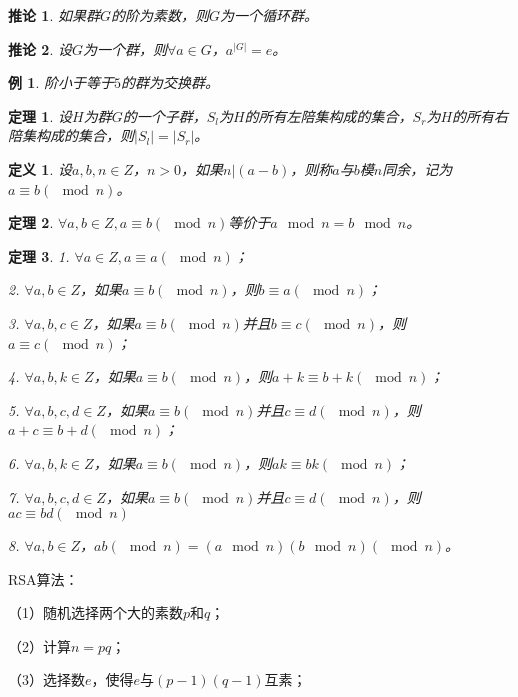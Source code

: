 \documentclass{article}
\newtheorem{Def}{定义}
\newtheorem{Thm}{定理}
\newtheorem*{Example}{例}
\newtheorem{Cor}{推论}
\begin{document}
\begin{CJK*}{UTF8}{gbsn}
\begin{Cor}
  如果群$G$的阶为素数，则$G$为一个循环群。
\end{Cor}

\begin{Cor}
  设$G$为一个群，则$\forall a\in G$，$a^{|G|}=e$。
\end{Cor}

\begin{Example}
  阶小于等于$5$的群为交换群。
\end{Example}

\begin{Thm}
  设$H$为群$G$的一个子群，$S_l$为$H$的所有左陪集构成的集合，$S_r$为$H$的所有右陪集构成的集合，则$|S_l|=|S_r|$。
\end{Thm}

\begin{Def}
  设$a,b,n\in Z$，$n>0$，如果$n|(a-b)$，则称$a$与$b$模$n$同余，记为$a \equiv b(\mod n)$。
\end{Def}

\begin{Thm}
  $\forall a,b\in Z, a\equiv b(\mod n)$等价于$a\mod n = b \mod n$。
\end{Thm}

\begin{Thm}
  1. $\forall a\in Z, a \equiv a (\mod n)$；

  2. $\forall a, b\in Z$，如果$a\equiv b (\mod n)$，则$b\equiv a(\mod n)$；

  3. $\forall a,b,c\in Z$，如果$a\equiv b(\mod n)$并且$b\equiv c(\mod n)$，则$a\equiv c(\mod n)$；

  4. $\forall a,b,k\in Z$，如果$a\equiv b(\mod n)$，则$a+k\equiv b+k(\mod n)$；

  5. $\forall a,b,c,d\in Z$，如果$a\equiv b(\mod n)$并且$c\equiv d(\mod n)$，则$a+c\equiv b+d (\mod n)$；

  6. $\forall a,b,k\in Z$，如果$a\equiv b(\mod n)$，则$ak\equiv bk(\mod n)$；

  7. $\forall a,b,c,d\in Z$，如果$a\equiv b(\mod n)$并且$c\equiv d(\mod n)$，则$ac\equiv bd (\mod n)$

  8. $\forall a,b\in Z$，$ab (\mod n)=(a\mod n)(b\mod n) (\mod n)$。
\end{Thm}

RSA算法：

（1）随机选择两个大的素数$p$和$q$；

（2）计算$n=pq$；

（3）选择数$e$，使得$e$与$(p-1)(q-1)$互素；


\end{CJK*}
\end{document}
